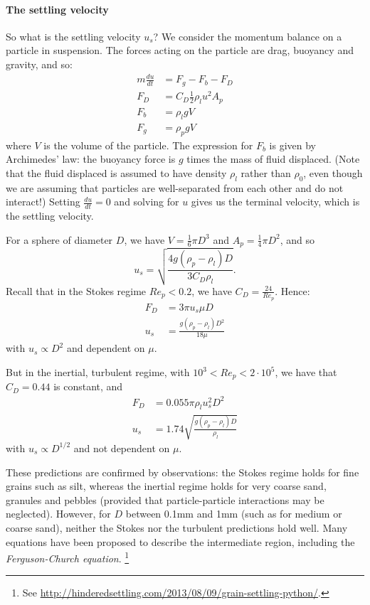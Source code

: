 \paragraph{The settling velocity} So what is the settling velocity $u_s$?
We consider the momentum balance on a particle in suspension. The forces acting
on the particle are drag, buoyancy and gravity, and so:
\begin{align}
    m\frac{du}{dt} &= F_g - F_b - F_D \\
    F_D            &= C_D\frac{1}{2}\rho_lu^2A_p \\
    F_b            &= \rho_lgV \\
    F_g            &= \rho_pgV
\end{align}
where $V$ is the volume of the particle. The expression for $F_b$ is given by
Archimedes' law: the buoyancy force is $g$ times the mass of fluid displaced.
(Note that the fluid displaced is assumed to have density $\rho_l$ rather than
$\rho_0$, even though we are assuming that particles are well-separated from
each other and do not interact!) Setting $\frac{du}{dt} = 0$ and solving for $u$
gives us the terminal velocity, which is the settling velocity.

For a sphere of diameter $D$, we have $V = \frac{1}{6}\pi D^3$ and $A_p =
\frac{1}{4}\pi D^2$, and so
\begin{equation}
    u_s=\sqrt{\frac{4g(\rho_p-\rho_l)D}{3C_D\rho_l}}.
\end{equation}
Recall that in the Stokes regime $Re_p < 0.2$, we have $C_D=\frac{24}{Re_p}$. Hence:
\begin{align}
    F_D &= 3\pi u_s \mu D \\
    u_s &= \frac{g(\rho_p-\rho_l)D^2}{18\mu}
\end{align}
with $u_s \propto D^2$ and dependent on $\mu$. 

But in the inertial, turbulent regime, with $10^3 < Re_p < 2\cdot10^5$, we have
that $C_D=0.44$ is constant, and 
\begin{align}
    F_D &= 0.055\pi\rho_lu_s^2D^2 \\
    u_s &= 1.74\sqrt{\frac{g(\rho_p-\rho_l)D}{\rho_l}}
\end{align}
with $u_s \propto D^{1/2}$ and not dependent on $\mu$.

These predictions are confirmed by observations: the Stokes regime holds for
fine grains such as silt, whereas the inertial regime holds for very coarse
sand, granules and pebbles (provided that particle-particle interactions may be
neglected). However, for $D$ between 0.1mm and 1mm (such as for medium or coarse
sand), neither the Stokes nor the turbulent predictions hold well. Many
equations have been proposed to describe the intermediate region, including the
\textit{Ferguson-Church equation}.  \footnote{See
\url{http://hinderedsettling.com/2013/08/09/grain-settling-python/}.}

